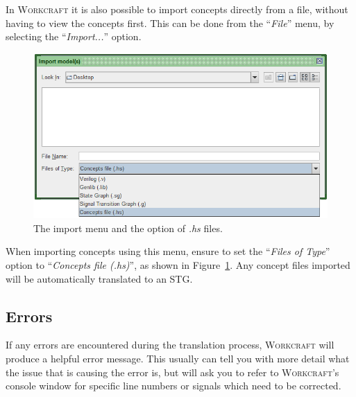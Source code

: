 \documentclass[british,conference,compsoc]{IEEEtran}
\newcommand{\noun}[1]{\textsc{#1}}
\begin{document}
In \noun{Workcraft} it is also possible to import concepts directly from a file,
without having to view the concepts first. This can be done from the 
``\emph{File}'' menu, by selecting the ``\emph{Import...}'' option. 

\begin{figure}[H]
\begin{centering}
\includegraphics[scale=0.4]{Images/import_menu_screenshot.png}
\par\end{centering}

\begin{centering}
\protect\caption{\label{fig:import_menu_screenshot}The import menu and the 
			option of \emph{.hs} files.}

\par\end{centering}

\end{figure}

When importing concepts using this menu, ensure to set the 
``\emph{Files of Type}'' option to ``\emph{Concepts file (.hs)}'', as shown in 
Figure~\ref{fig:import_menu_screenshot}. Any concept files imported will be
automatically translated to an STG.

\subsection{Errors}

If any errors are encountered during the translation process, \noun{Workcraft} 
will produce a helpful error message. This usually can tell you with more 
detail what the issue that is causing the error is, but will ask you to refer 
to \noun{Workcraft}'s console window for specific line numbers or signals which
need to be corrected. 
\end{document}
